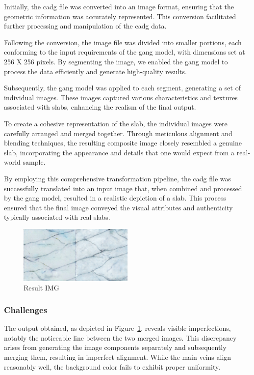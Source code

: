 Initially, the \gls{cadg} file was converted into an image format, ensuring that the geometric information was accurately represented. 
This conversion facilitated further processing and manipulation of the \gls{cadg} data.

Following the conversion, the image file was divided into smaller portions, each conforming to the input requirements of the \gls{gang} model, with dimensions set at 256 X 256 pixels. 
By segmenting the image, we enabled the \gls{gang} model to process the data efficiently and generate high-quality results.

Subsequently, the \gls{gang} model was applied to each segment, generating a set of individual images. 
These images captured various characteristics and textures associated with slabs, enhancing the realism of the final output.

To create a cohesive representation of the slab, the individual images were carefully arranged and merged together. 
Through meticulous alignment and blending techniques, the resulting composite image closely resembled a genuine slab, incorporating the appearance and details that one would expect from a real-world sample.

By employing this comprehensive transformation pipeline, the \gls{cadg} file was successfully translated into an input image that, when combined and processed by the \gls{gang} model, resulted in a realistic depiction of a slab. 
This process ensured that the final image conveyed the visual attributes and authenticity typically associated with real slabs.

\begin{figure}
    \centering
    \includegraphics[width=0.50\textwidth]{images/cad-to-gan/result}
    \caption{Result IMG}\label{fig:cad-to-gan}
\end{figure}

\subsubsection{Challenges}\label{subsec:issues}
The output obtained, as depicted in Figure~\ref{fig:cad-to-gan}, reveals visible imperfections, notably the noticeable line between the two merged images. 
This discrepancy arises from generating the image components separately and subsequently merging them, resulting in imperfect alignment. 
While the main veins align reasonably well, the background color fails to exhibit proper uniformity.


